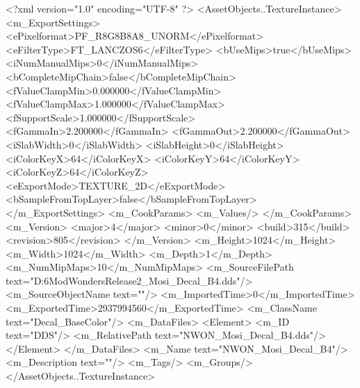 <?xml version="1.0" encoding="UTF-8" ?>
<AssetObjects..TextureInstance>
	<m_ExportSettings>
		<ePixelformat>PF_R8G8B8A8_UNORM</ePixelformat>
		<eFilterType>FT_LANCZOS6</eFilterType>
		<bUseMips>true</bUseMips>
		<iNumManualMips>0</iNumManualMips>
		<bCompleteMipChain>false</bCompleteMipChain>
		<fValueClampMin>0.000000</fValueClampMin>
		<fValueClampMax>1.000000</fValueClampMax>
		<fSupportScale>1.000000</fSupportScale>
		<fGammaIn>2.200000</fGammaIn>
		<fGammaOut>2.200000</fGammaOut>
		<iSlabWidth>0</iSlabWidth>
		<iSlabHeight>0</iSlabHeight>
		<iColorKeyX>64</iColorKeyX>
		<iColorKeyY>64</iColorKeyY>
		<iColorKeyZ>64</iColorKeyZ>
		<eExportMode>TEXTURE_2D</eExportMode>
		<bSampleFromTopLayer>false</bSampleFromTopLayer>
	</m_ExportSettings>
	<m_CookParams>
		<m_Values/>
	</m_CookParams>
	<m_Version>
		<major>4</major>
		<minor>0</minor>
		<build>315</build>
		<revision>805</revision>
	</m_Version>
	<m_Height>1024</m_Height>
	<m_Width>1024</m_Width>
	<m_Depth>1</m_Depth>
	<m_NumMipMaps>10</m_NumMipMaps>
	<m_SourceFilePath text="D:\Civ6Mod\Terrain\NW\Natural Wonders\TM Release2\VictoriaFalls\MarshTextures\NWON_Mosi_Decal_B4.dds"/>
	<m_SourceObjectName text=""/>
	<m_ImportedTime>0</m_ImportedTime>
	<m_ExportedTime>2937994560</m_ExportedTime>
	<m_ClassName text="Decal_BaseColor"/>
	<m_DataFiles>
		<Element>
			<m_ID text="DDS"/>
			<m_RelativePath text="NWON_Mosi_Decal_B4.dds"/>
		</Element>
	</m_DataFiles>
	<m_Name text="NWON_Mosi_Decal_B4"/>
	<m_Description text=""/>
	<m_Tags/>
	<m_Groups/>
</AssetObjects..TextureInstance>

